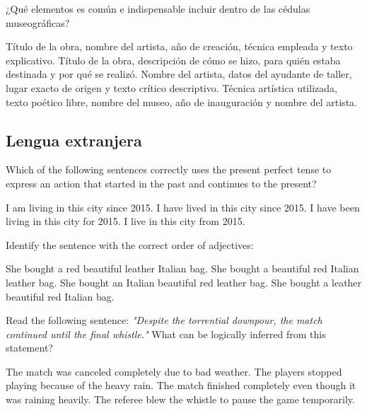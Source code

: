 \documentclass[12pt]{evaluasep}
\begin{document}
\begin{questions}
    \question ¿Qué elementos es común e indispensable incluir dentro de las cédulas museográficas?
    \begin{choices}
        \CorrectChoice Título de la obra, nombre del artista, año de creación, técnica empleada y texto explicativo.
        \choice Título de la obra, descripción de cómo se hizo, para quién estaba destinada y por qué se realizó.
        \choice Nombre del artista, datos del ayudante de taller, lugar exacto de origen y texto crítico descriptivo.
        \choice Técnica artística utilizada, texto poético libre, nombre del museo, año de inauguración y nombre del artista.
    \end{choices}
	

				    \subsection{Lengua extranjera}

\question Which of the following sentences correctly uses the present perfect tense to express an action that started in the past and continues to the present?
    \begin{choices}
        \choice I am living in this city since 2015.
        \CorrectChoice I have lived in this city since 2015.
        \choice I have been living in this city for 2015.
        \choice I live in this city from 2015.
    \end{choices}
   
\newpage
    \question Identify the sentence with the correct order of adjectives:
    \begin{choices}
        \choice She bought a red beautiful leather Italian bag.
        \CorrectChoice She bought a beautiful red Italian leather bag.
        \choice She bought an Italian beautiful red leather bag.
        \choice She bought a leather beautiful red Italian bag.
    \end{choices}
   

    \question Read the following sentence: \textit{"Despite the torrential downpour, the match continued until the final whistle."} What can be logically inferred from this statement?
    \begin{choices}
        \choice The match was canceled completely due to bad weather.
        \choice The players stopped playing because of the heavy rain.
        \CorrectChoice The match finished completely even though it was raining heavily.
        \choice The referee blew the whistle to pause the game temporarily.
    \end{choices}
   


\end{questions}
\end{document}
